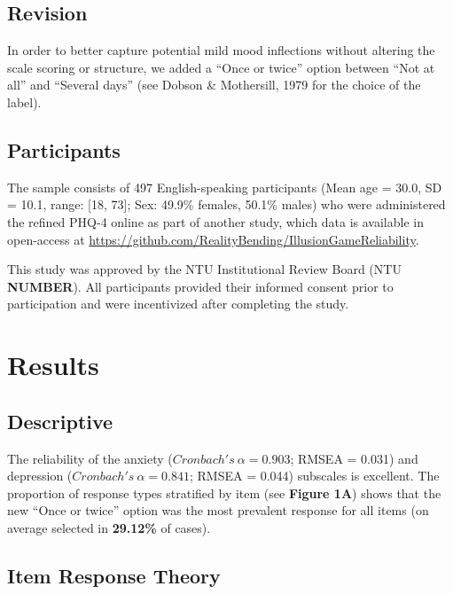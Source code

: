 \documentclass[
  man,floatsintext]{apa6}
\begin{document}
\hypertarget{revision}{%
\subsection{Revision}\label{revision}}

In order to better capture potential mild mood inflections without altering the scale scoring or structure, we added a ``Once or twice'' option between ``Not at all'' and ``Several days'' (see Dobson \& Mothersill, 1979 for the choice of the label).

\hypertarget{participants}{%
\subsection{Participants}\label{participants}}

The sample consists of 497 English-speaking participants (Mean age = 30.0, SD = 10.1, range: {[}18, 73{]}; Sex: 49.9\% females, 50.1\% males) who were administered the refined PHQ-4 online as part of another study, which data is available in open-access at \url{https://github.com/RealityBending/IllusionGameReliability}.

This study was approved by the NTU Institutional Review Board (NTU \textbf{NUMBER}). All participants provided their informed consent prior to participation and were incentivized after completing the study.

\hypertarget{results}{%
\section{Results}\label{results}}

\hypertarget{descriptive}{%
\subsection{Descriptive}\label{descriptive}}

The reliability of the anxiety (\(Cronbach's~\alpha = 0.903\); RMSEA = 0.031) and depression (\(Cronbach's~\alpha = 0.841\); RMSEA = 0.044) subscales is excellent. The proportion of response types stratified by item (see \textbf{Figure 1A}) shows that the new ``Once or twice'' option was the most prevalent response for all items (on average selected in \textbf{29.12\%} of cases).

\hypertarget{item-response-theory}{%
\subsection{Item Response Theory}\label{item-response-theory}}
\end{document}
